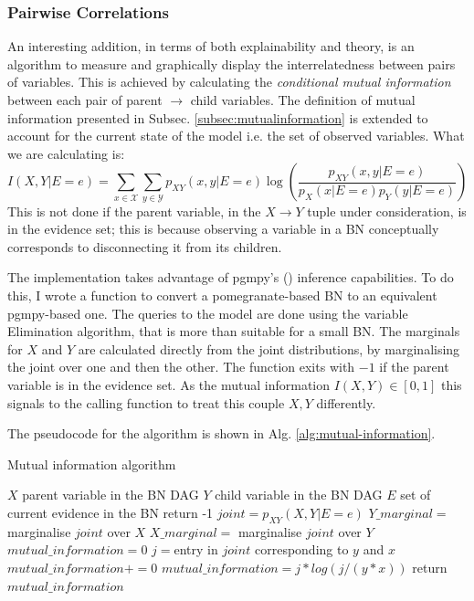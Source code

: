 \subsubsection{Pairwise Correlations}
An interesting addition, in terms of both explainability and theory, is an algorithm to measure and graphically display the interrelatedness between pairs of variables.
This is achieved by calculating the \textit{conditional mutual information}  between each pair of parent $\rightarrow$ child variables.
The definition of mutual information presented in Subsec. \ref{subsec:mutualinformation} is extended to account for the current state of the model i.e. the set of observed variables.
What we are calculating is:
\begin{equation}
	I(X,Y|E=e) = \sum_{x \in \mathcal{X}} \sum_{y \in \mathcal{Y}} p_{XY}(x,y|E=e) \log \left( \frac{p_{XY}(x, y|E=e)}{p_{X}(x|E=e) p_{Y}(y|E=e)} \right)
\end{equation}
This is not done if the parent variable, in the $X \rightarrow Y$ tuple under consideration, is in the evidence set; this is because observing a variable in a BN conceptually corresponds to disconnecting it from its children.

The implementation takes advantage of pgmpy's (\cite{pgmpy}) inference capabilities. 
To do this, I wrote a function to convert a pomegranate-based BN to an equivalent pgmpy-based one.
The queries to the model are done using the variable Elimination algorithm, that is more than suitable for a small BN.
The marginals for $X$ and $Y$ are calculated directly from the joint distributions, by marginalising the joint over one and then the other.
The function exits with $-1$ if the parent variable is in the evidence set.
As the mutual information $I(X,Y) \in [0,1]$ this signals to the calling function to treat this couple $X,Y$ differently.

The pseudocode for the algorithm is shown in Alg. \ref{alg:mutual-information}.

\begin{algorithm}[htp!]
	\caption{Mutual information algorithm}
	\label{alg:mutual-information}
	\begin{algorithmic}[1]
		\State $X$ parent variable in the BN DAG
		\State $Y$ child variable in the BN DAG
		\State $E$ set of current evidence in the BN
			\State return -1
		\EndIf
		\State $joint=p_{XY}(X, Y|E=e)$
		\State $Y\_marginal=$ marginalise $joint$ over $X$
		\State $X\_marginal=$ marginalise $joint$ over $Y$
		\State $mutual\_information = 0$
				\State $j=$entry in $joint$ corresponding to $y$ and $x$
					\State $mutual\_information += 0$
				\Else
					\State $mutual\_information = j * log( j / ( y * x ) )$
				\EndIf
			\EndFor
		\EndFor
		\State return $mutual\_information$
	\end{algorithmic}
\end{algorithm}